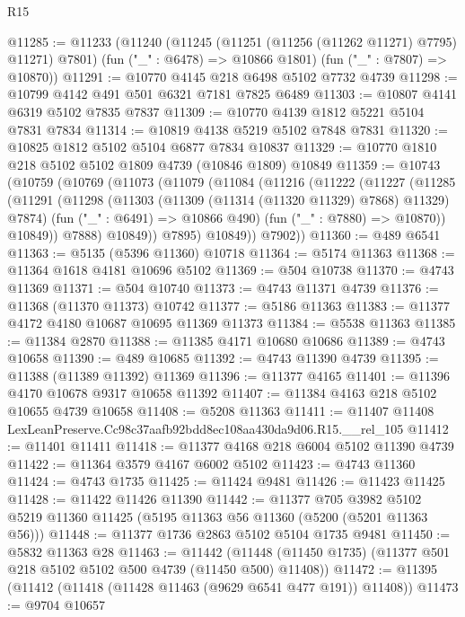 \begin{lexlean}{R15}
\begin{coremodule}
{{{{{{{{{{{@11285 := @11233
    (@11240
      (@11245 (@11251 (@11256 (@11262 @11271) @7795) @11271) @7801)
      (fun ("_" : @6478) => @10866 @1801)
      (fun ("_" : @7807) => @10870))
@11291 := @10770 @4145 @218 @6498 @5102 @7732 @4739
@11298 := @10799 @4142 @491 @501 @6321 @7181 @7825 @6489
@11303 := @10807 @4141 @6319 @5102 @7835 @7837
@11309 := @10770 @4139 @1812 @5221 @5104 @7831 @7834
@11314 := @10819 @4138 @5219 @5102 @7848 @7831
@11320 := @10825 @1812 @5102 @5104 @6877 @7834 @10837
@11329 := @10770 @1810 @218 @5102 @5102 @1809 @4739 (@10846 @1809) @10849
@11359 := @10743
    (@10759
      (@10769
        (@11073
          (@11079
            (@11084
              (@11216
                (@11222
                  (@11227
                    (@11285
                      (@11291
                        (@11298
                          (@11303 (@11309 (@11314 (@11320 @11329) @7868) @11329) @7874)
                          (fun ("_" : @6491) => @10866 @490)
                          (fun ("_" : @7880) => @10870))
                        @10849))
                    @7888)
                  @10849))
              @7895)
            @10849))
        @7902))
@11360 := @489 @6541
@11363 := @5135 (@5396 @11360) @10718
@11364 := @5174 @11363
@11368 := @11364 @1618 @4181 @10696 @5102
@11369 := @504 @10738
@11370 := @4743 @11369
@11371 := @504 @10740
@11373 := @4743 @11371 @4739
@11376 := @11368 (@11370 @11373) @10742
@11377 := @5186 @11363
@11383 := @11377 @4172 @4180 @10687 @10695 @11369 @11373
@11384 := @5538 @11363
@11385 := @11384 @2870
@11388 := @11385 @4171 @10680 @10686
@11389 := @4743 @10658
@11390 := @489 @10685
@11392 := @4743 @11390 @4739
@11395 := @11388 (@11389 @11392) @11369
@11396 := @11377 @4165
@11401 := @11396 @4170 @10678 @9317 @10658 @11392
@11407 := @11384 @4163 @218 @5102 @10655 @4739 @10658
@11408 := @5208 @11363
@11411 := @11407 @11408 LexLeanPreserve.Cc98c37aafb92bdd8ec108aa430da9d06.R15.__rel_105
@11412 := @11401 @11411
@11418 := @11377 @4168 @218 @6004 @5102 @11390 @4739
@11422 := @11364 @3579 @4167 @6002 @5102
@11423 := @4743 @11360
@11424 := @4743 @1735
@11425 := @11424 @9481
@11426 := @11423 @11425
@11428 := @11422 @11426 @11390
@11442 := @11377
    @705
    @3982
    @5102
    @5219
    @11360
    @11425
    (@5195 @11363 @56 @11360 (@5200 (@5201 @11363 @56)))
@11448 := @11377 @1736 @2863 @5102 @5104 @1735 @9481
@11450 := @5832 @11363 @28
@11463 := @11442
    (@11448 (@11450 @1735) (@11377 @501 @218 @5102 @5102 @500 @4739 (@11450 @500) @11408))
@11472 := @11395 (@11412 (@11418 (@11428 @11463 (@9629 @6541 @477 @191)) @11408))
@11473 := @9704 @10657
}}}}}}}}}}}
\end{coremodule}
\end{lexlean}
